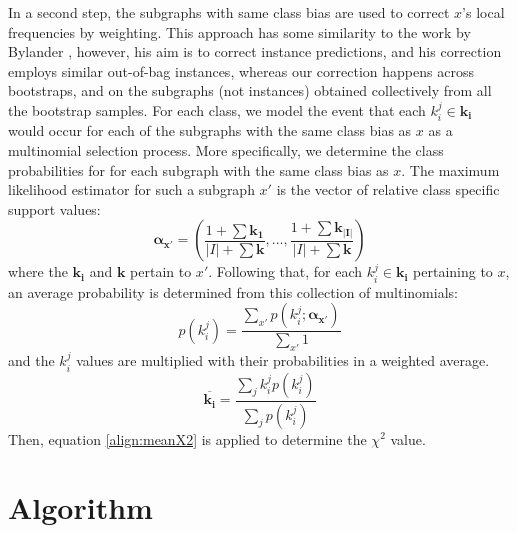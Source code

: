 \documentclass{article}
\begin{document}
In a second step, the subgraphs with same class bias are used to correct $x$'s
local frequencies by weighting. This approach has some similarity to the work
by Bylander \cite{bylander02estimating}, however, his aim is to correct
instance predictions, and his correction employs similar out-of-bag instances,
whereas our correction happens across bootstraps, and on the subgraphs (not
instances) obtained collectively from all the bootstrap samples.  For each
class, we model the event that each $k_i^j \in \mathbf{k_i}$ would occur for
each of the subgraphs with the same class bias as $x$ as a multinomial
selection process.  More specifically, we determine the class probabilities for
for each subgraph with the same class bias as $x$. The maximum likelihood
estimator for such a subgraph $x'$ is the vector of relative class specific
support values:
\begin{equation}
  \mathbf{\alpha_{x'}} = \left(\frac{1+\sum{\mathbf{k_1}}}{\vert I\vert+\sum{\mathbf{k}}},\ldots,\frac{1+\sum{\mathbf{k_{\vert I\vert}}}}{\vert I\vert+\sum{\mathbf{k}}}\right)
  \label{eqn:mlexpr}
\end{equation}
where the $\mathbf{k_i}$ and $\mathbf{k}$ pertain to $x'$. Following that, for
each $k_i^j \in \mathbf{k_i}$ pertaining to $x$, an average probability is determined from this
collection of multinomials:
\begin{equation}
  p(k_i^j)=\frac{\sum_{x'} p(k_i^j; \mathbf{\alpha_{x'}})}{\sum_{x'}1}
  \label{eqn:avgpr}
\end{equation}
and the $k_i^j$ values are multiplied with their probabilities in a weighted average.
\begin{equation}
  \overline{\mathbf{k_i}}=\frac{\sum_j k_i^j p(k_i^j)}{\sum_j p(k_i^j)}
  \label{eqn:avgki}
\end{equation}
Then, equation \ref{align:meanX2} is applied to determine the $\chi^2$ value.

\section{Algorithm}
\end{document}
